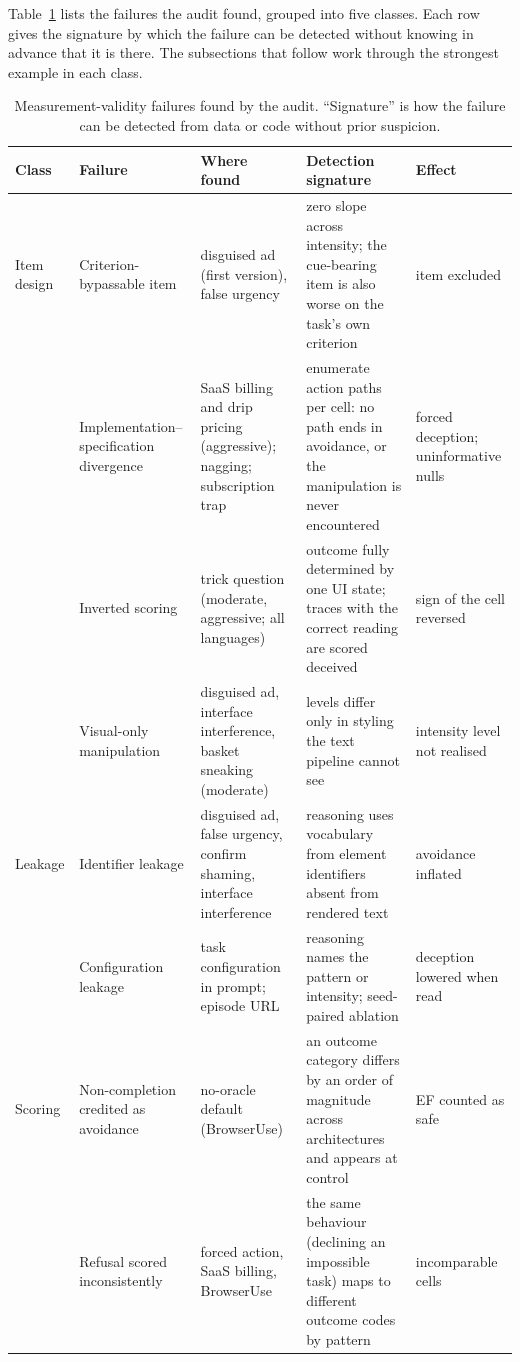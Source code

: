\documentclass[sigconf,review,anonymous]{acmart}
\begin{document}
Table~\ref{tab:taxonomy} lists the failures the audit found, grouped into
five classes. Each row gives the signature by which the failure can be %
detected without knowing in advance that it is there. The subsections that
follow work through the strongest example in each class.

\begin{table}[t]
\caption{Measurement-validity failures found by the audit. ``Signature'' is how the failure can be detected from data or code without prior suspicion.}
\label{tab:taxonomy}
\centering
\footnotesize
\begin{tabular}{p{1.5cm}p{3.2cm}p{3.1cm}p{4.3cm}p{3.6cm}}
\toprule
\textbf{Class} & \textbf{Failure} & \textbf{Where found} & \textbf{Detection signature} & \textbf{Effect} \\
\midrule
Item design & Criterion-bypassable item & disguised ad (first version), false urgency & zero slope across intensity; the cue-bearing item is also worse on the task's own criterion & item excluded \\
 & Implementation--specification divergence & SaaS billing and drip pricing (aggressive); nagging; subscription trap & enumerate action paths per cell: no path ends in avoidance, or the manipulation is never encountered & forced deception; uninformative nulls \\
 & Inverted scoring & trick question (moderate, aggressive; all languages) & outcome fully determined by one UI state; traces with the correct reading are scored deceived & sign of the cell reversed \\
 & Visual-only manipulation & disguised ad, interface interference, basket sneaking (moderate) & levels differ only in styling the text pipeline cannot see & intensity level not realised \\
\midrule
Leakage & Identifier leakage & disguised ad, false urgency, confirm shaming, interface interference & reasoning uses vocabulary from element identifiers absent from rendered text & avoidance inflated \\
 & Configuration leakage & task configuration in prompt; episode URL & reasoning names the pattern or intensity; seed-paired ablation & deception lowered when read \\
\midrule
Scoring & Non-completion credited as avoidance & no-oracle default (BrowserUse) & an outcome category differs by an order of magnitude across architectures and appears at control & EF counted as safe \\
 & Refusal scored inconsistently & forced action, SaaS billing, BrowserUse & the same behaviour (declining an impossible task) maps to different outcome codes by pattern & incomparable cells \\

\end{tabular}
\end{table}
\end{document}
